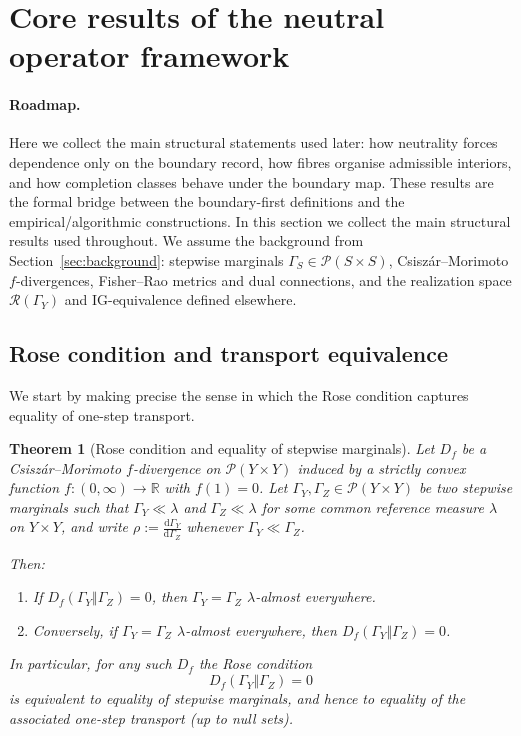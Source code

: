 \documentclass[11pt]{article}
\newtheorem{theorem}{Theorem}
\begin{document}
\section{Core results of the neutral operator framework}
\label{sec:core-results}


\paragraph{Roadmap.}
Here we collect the main structural statements used later: how neutrality forces dependence only on the boundary record, how fibres organise admissible interiors, and how completion classes behave under the boundary map.
These results are the formal bridge between the boundary-first definitions and the empirical/algorithmic constructions.
\medskip
In this section we collect the main structural results used throughout.
We assume the background from Section~\ref{sec:background}:
stepwise marginals $\Gamma_S\in\mathcal{P}(S\times S)$, Csiszár--Morimoto
$f$-divergences, Fisher--Rao metrics and dual connections, and the
realization space $\mathcal{R}(\Gamma_Y)$ and IG-equivalence defined
elsewhere.

\subsection{Rose condition and transport equivalence}

We start by making precise the sense in which the Rose condition
captures equality of one-step transport.

\begin{theorem}[Rose condition and equality of stepwise marginals]
\label{thm:rose-condition}
Let $D_f$ be a Csiszár--Morimoto $f$-divergence on
$\mathcal{P}(Y\times Y)$ induced by a strictly convex function
$f:(0,\infty)\to\mathbb{R}$ with $f(1)=0$. Let
$\Gamma_Y,\Gamma_Z\in\mathcal{P}(Y\times Y)$ be two stepwise marginals
such that $\Gamma_Y\ll\lambda$ and $\Gamma_Z\ll\lambda$ for some common
reference measure $\lambda$ on $Y\times Y$, and write
$\rho := \frac{\mathrm d\Gamma_Y}{\mathrm d\Gamma_Z}$ whenever
$\Gamma_Y\ll\Gamma_Z$.

Then:
\begin{enumerate}[label=(\alph*),leftmargin=1.8em]
  \item If $D_f(\Gamma_Y\Vert\Gamma_Z)=0$, then
  $\Gamma_Y=\Gamma_Z$ $\lambda$-almost everywhere.
  \item Conversely, if $\Gamma_Y=\Gamma_Z$ $\lambda$-almost everywhere,
  then $D_f(\Gamma_Y\Vert\Gamma_Z)=0$.
\end{enumerate}

In particular, for any such $D_f$ the Rose condition
\[
  D_f(\Gamma_Y\Vert\Gamma_Z)=0
\]
is equivalent to equality of stepwise marginals, and hence to equality
of the associated one-step transport (up to null sets).
\end{theorem}
\end{document}
